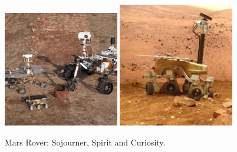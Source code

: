 \begin{description}
\begin{figure}[thpb]
	  \myfloatalign
      \footnotesize
      \centering
    \subfloat
    {  \label{fig:fig_nasa}
        \includegraphics[width=0.45\textwidth,height=0.2\textheight]{figures/fig_marsrover.jpg}
    }
    \subfloat
    {  \label{fig:fig_rover}
        \includegraphics[width=0.45\textwidth,height=0.2\textheight]{figures/fig_rover.png}
    }     
   \caption[Mars rover]{Mars Rover: Sojourner, Spirit and Curiosity.}
   \label{fig:fig_rover}
\end{figure}


\end{description}
